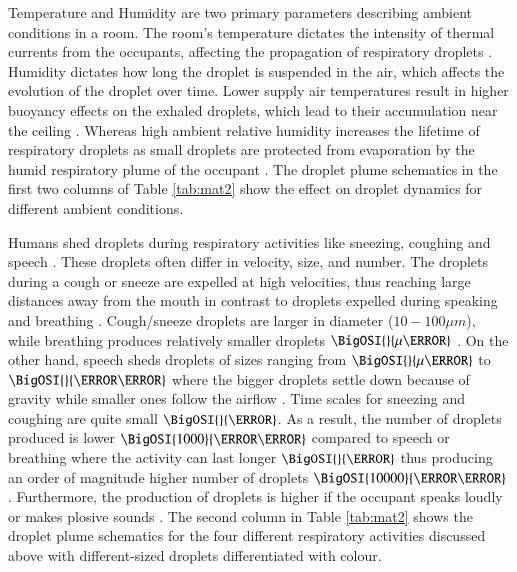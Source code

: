 \documentclass[preprint,12pt]{elsarticle}
\begin{document}
Temperature and Humidity are two primary parameters describing ambient conditions in a room. The room's temperature dictates the intensity of thermal currents from the occupants, affecting the propagation of respiratory droplets \cite{feng2020study}. Humidity dictates how long the droplet is suspended in the air, which affects the evolution of the droplet over time. Lower supply air temperatures result in higher buoyancy effects on the exhaled droplets, which lead to their accumulation near the ceiling \cite{zhang2019distribution}. Whereas high ambient relative humidity increases the lifetime of respiratory droplets as small droplets are protected from evaporation by the humid respiratory plume of the occupant \cite{chong2021extended}. The droplet plume schematics in the first two columns of Table \ref{tab:mat2} show the effect on droplet dynamics for different ambient conditions.

Humans shed droplets during respiratory activities like sneezing, coughing and speech \cite{stadnytskyi2021breathing}. These droplets often differ in velocity, size, and number. The droplets during a cough or sneeze are expelled at high velocities, thus reaching large distances away from the mouth in contrast to droplets expelled during speaking and breathing \cite{pendar2020numerical,zhang2019distribution}. Cough/sneeze droplets are larger in diameter ($ 10-100 \mu m$), while breathing produces relatively smaller droplets $\BigOSI{}{\mu\meter}$ \cite{shao2021risk}. On the other hand, speech sheds droplets of sizes ranging from $\BigOSI{}{\mu\meter}$ to $\BigOSI{}{\milli\meter}$ where the bigger droplets settle down because of gravity while smaller ones follow the airflow \cite{tan2021experimental}. Time scales for sneezing and coughing are quite small $\BigOSI{}{\second}$. As a result, the number of droplets produced is lower $\BigOSI{1000}{\per\second}$ compared to speech or breathing where the activity can last longer $\BigOSI{}{\minute}$ thus producing an order of magnitude higher number of droplets $\BigOSI{10000}{\per\second}$ \cite{giri2022colliding}. Furthermore, the production of droplets is higher if the occupant speaks loudly or makes plosive sounds \cite{abkarian2020speech}. The second column in Table \ref{tab:mat2} shows the droplet plume schematics for the four different respiratory activities discussed above with different-sized droplets differentiated with colour.
\end{document}
